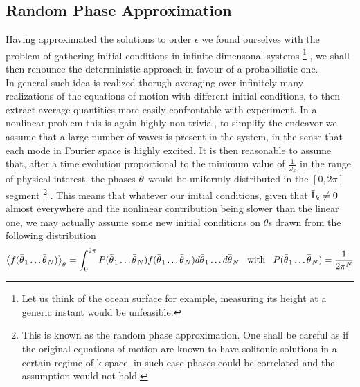 \subsection{Random Phase Approximation}
Having approximated the solutions to order $\epsilon$ we found ourselves with the problem of gathering 
initial conditions in infinite dimensonal systems
\footnote{Let us think of the ocean surface for example, measuring its height at a generic instant would be unfeasible.}
, we shall then renounce the deterministic approach in favour of 
a probabilistic one.\\
In general such idea is realized thorugh averaging over infinitely many realizations of the equations of motion with different initial conditions, to then extract 
average quantities more easily confrontable with experiment. In a nonlinear problem this is again highly non trivial, to simplify the endeavor we assume that
a large number of waves is present in the system, in the sense that each mode in Fourier space is highly excited. It is then reasonable to assume that, after a time
evolution proportional to the minimum value of $\frac{1}{\omega_k}$ in the range of physical interest, the phases $\theta^{}$ would be uniformly distributed in the $\left[0,2\pi\right]$ segment 
\footnote{This is known as the random phase approximation. One shall be careful as if the original equations of motion are known to have solitonic solutions in a certain regime of k-space, 
in such case phases could be correlated and the assumption would not hold.}
. This means that whatever our initial conditions, given that $\bar{\mathrm{I}^{}}_k \neq 0$ almost everywhere and the nonlinear contribution being slower than the linear one,
we may actually assume some new initial conditions on $\theta$s drawn from the following distribution
\begin{equation}
    \left\langle f(\bar{\theta^{}}_1 \dots \bar{\theta^{}}_N) \right\rangle_{\bar{\theta}^{}} = 
    \int_{0}^{2\pi} P(\bar{\theta^{}}_1 \dots \bar{\theta^{}}_N)f(\bar{\theta^{}}_1 \dots \bar{\theta^{}}_N) d\bar{\theta^{}}_1 \dots d\bar{\theta^{}}_N 
    \hspace{3mm} \text{with} \hspace{3mm}
    P(\bar{\theta^{}}_1 \dots \bar{\theta^{}}_N) = \frac{1}{2\pi^{N}}
\end{equation}

